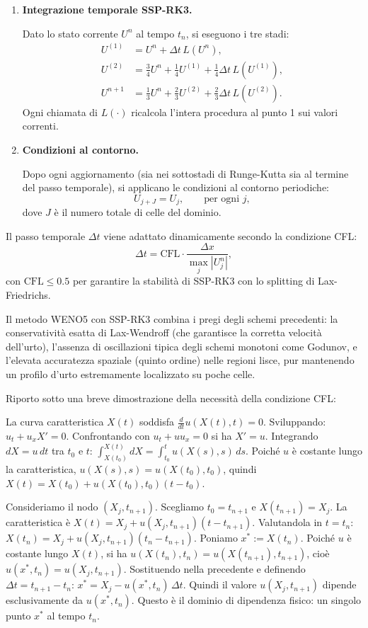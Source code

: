 \documentclass[12pt]{article}
\begin{document}
\begin{enumerate}
    \item \textbf{Integrazione temporale SSP-RK3.}
    
    Dato lo stato corrente \(U^n\) al tempo \(t_n\), si eseguono i tre stadi:
    \[
    \begin{aligned}
    U^{(1)} &= U^n + \Delta t\, L(U^n), \\[4pt]
    U^{(2)} &= \frac34 U^n + \frac14 U^{(1)} + \frac14 \Delta t\, L(U^{(1)}), \\[4pt]
    U^{n+1} &= \frac13 U^n + \frac23 U^{(2)} + \frac23 \Delta t\, L(U^{(2)}).
    \end{aligned}
    \]
    Ogni chiamata di \(L(\cdot)\) ricalcola l'intera procedura al punto 1 sui valori correnti.
    
    \item \textbf{Condizioni al contorno.}
    
    Dopo ogni aggiornamento (sia nei sottostadi di Runge-Kutta sia al termine del passo temporale), si applicano le condizioni al contorno periodiche:
    \[
    U_{j+J} = U_j, \qquad \text{per ogni } j,
    \]
    dove \(J\) è il numero totale di celle del dominio.
\end{enumerate}

Il passo temporale \(\Delta t\) viene adattato dinamicamente secondo la condizione CFL:
\[
\Delta t = \text{CFL} \cdot \frac{\Delta x}{\max_j |U_j^n|},
\]
con \(\text{CFL} \le 0.5\) per garantire la stabilità di SSP-RK3 con lo splitting di Lax-Friedrichs.

Il metodo WENO5 con SSP-RK3 combina i pregi degli schemi precedenti: la conservatività esatta di Lax-Wendroff (che garantisce la corretta velocità dell'urto), l'assenza di oscillazioni tipica degli schemi monotoni come Godunov, e l'elevata accuratezza spaziale (quinto ordine) nelle regioni lisce, pur mantenendo un profilo d'urto estremamente localizzato su poche celle.

Riporto sotto una breve dimostrazione della necessità della condizione CFL:

La curva caratteristica \(X(t)\) soddisfa \(\frac{d}{dt}u(X(t),t)=0\). Sviluppando: \(u_t+u_x X'=0\). Confrontando con \(u_t+u u_x=0\) si ha \(X'=u\). Integrando \(dX = u\,dt\) tra \(t_0\) e \(t\):  
\(\int_{X(t_0)}^{X(t)} dX = \int_{t_0}^{t} u(X(s),s)\,ds\). Poiché \(u\) è costante lungo la caratteristica, \(u(X(s),s)=u(X(t_0),t_0)\), quindi  
\(X(t) = X(t_0) + u(X(t_0), t_0)(t-t_0)\).

Consideriamo il nodo \((X_j, t_{n+1})\). Scegliamo \(t_0 = t_{n+1}\) e \(X(t_{n+1})=X_j\). La caratteristica è  
\(X(t) = X_j + u(X_j, t_{n+1})(t-t_{n+1})\).  
Valutandola in \(t=t_n\):  
\(X(t_n) = X_j + u(X_j, t_{n+1})(t_n - t_{n+1})\).  
Poniamo \(x^* := X(t_n)\). Poiché \(u\) è costante lungo \(X(t)\), si ha \(u(X(t_n), t_n) = u(X(t_{n+1}), t_{n+1})\), cioè  
\(u(x^*, t_n) = u(X_j, t_{n+1})\).  
Sostituendo nella precedente e definendo \(\Delta t = t_{n+1}-t_n\):  
\(x^* = X_j - u(x^*, t_n)\,\Delta t\).  
Quindi il valore \(u(X_j, t_{n+1})\) dipende esclusivamente da \(u(x^*, t_n)\). Questo è il dominio di dipendenza fisico: un singolo punto \(x^*\) al tempo \(t_n\).
\end{document}
